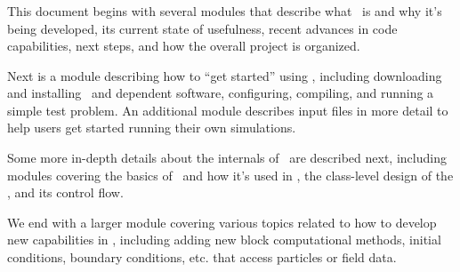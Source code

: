 \NEWSEC


\begin{frame}[fragile,label=ss-purpose] 
\frametitle{\ssPurpose}
\small
       This document begins with several modules that describe
       what \enzopcello\ is and why it's being developed, its current
       state of usefulness, recent advances in code capabilities, next
       steps, and how the overall project is organized.

\vspace{0.1in}
       Next is a module describing how to ``get started''
       using \enzop, including downloading and installing \enzopcello\
       and dependent software, configuring, compiling, and running a
       simple test problem.  An additional module describes input
       files in more detail to help users get started running their
       own simulations.

\vspace{0.1in}
       Some more in-depth details about the internals of \enzopcello\
       are described next, including modules covering the basics
       of \charm\ and how it's used in \enzopcello, the class-level
       design of the \enzopcello, and its control flow.

\vspace{0.1in}
       We end with a larger module covering various topics related to
       how to develop new capabilities in \enzop, including adding new
       block computational methods, initial conditions, boundary
       conditions, etc. that access particles or field data.

       


\end{frame}
